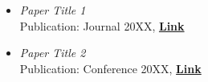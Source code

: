 \begin{itemize}[noitemsep, left=0pt]
    \item \emph{Paper Title 1} \\
    Publication: Journal 20XX, \textbf{{\href{https://doi.org/XXXXXXX}{Link}}}

    \item \emph{Paper Title 2} \\
    Publication: Conference 20XX, \textbf{{\href{https://doi.org/XXXXXXX}{Link}}}
\end{itemize}
\vspace{-13pt}